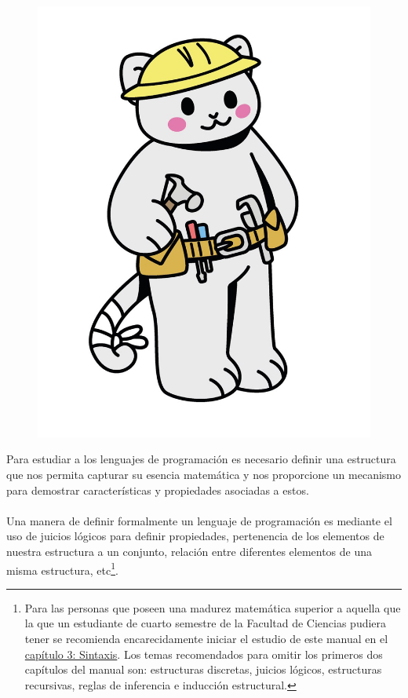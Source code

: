 

\begin{figure}[htbp]
    \centerline{\includegraphics[scale=.19]{assets/02_gatito_herramientas_matematicas.jpg}}
    \label{fig 1. Mapa para clasificar los lenguajes de programación.}        
\end{figure}

Para estudiar a los lenguajes de programación es necesario definir una estructura que nos permita capturar su esencia matemática y nos proporcione un mecanismo para demostrar características y propiedades asociadas a estos. \\\\
Una manera de definir formalmente un lenguaje de programación es mediante el uso de juicios lógicos para definir propiedades, pertenencia de los elementos de nuestra estructura a un conjunto, relación entre diferentes elementos de una misma estructura, etc\footnote{Para las personas que poseen una madurez matemática superior a aquella que la que un estudiante de cuarto semestre de la Facultad de Ciencias pudiera tener se recomienda encarecidamente iniciar el estudio de este manual en el \hyperref[sec:sintax]{capítulo 3: Sintaxis}. Los temas recomendados para omitir los primeros dos capítulos del manual son: estructuras discretas, juicios lógicos, estructuras recursivas, reglas de inferencia e inducción estructural. }. \\
